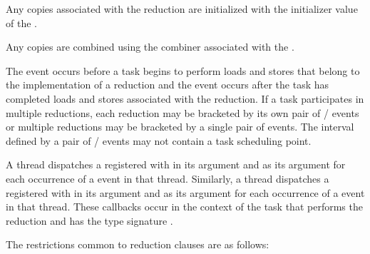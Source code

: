 Any copies associated with the reduction are initialized with the initializer
value of the .

Any copies are combined using the combiner associated with the
.

\events

The  event occurs before a task begins to perform 
loads and stores that belong to the implementation of a reduction and 
the  event occurs after the task has completed loads 
and stores associated with the reduction. If a task participates in 
multiple reductions, each reduction may be bracketed by its own pair of 
/ events or multiple reductions 
may be bracketed by a single pair of events. The interval defined by a 
pair of / events may not contain 
a task scheduling point.

\tools

A thread dispatches a registered  with
 in its  argument and
 as its  argument for each 
occurrence of a  event in that thread. Similarly,
a thread dispatches a registered  with
 in its  argument and
 as its  argument for each 
occurrence of a  event in that thread. These 
callbacks occur in the context of the task that performs the reduction
and has the type signature .

\restrictions
The restrictions common to reduction clauses are as follows:


